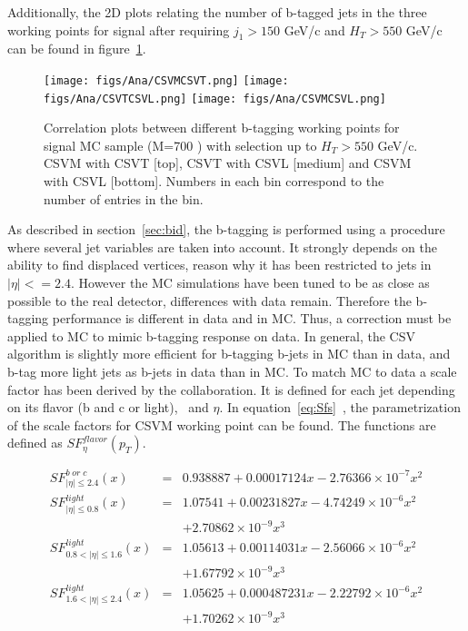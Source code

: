 Additionally, the 2D plots relating the number of b-tagged jets in the three working points for signal after requiring $j_{1}>150$ GeV/c and $H_{T}>550$ GeV/c can be found in figure~\ref{fig:WPcorr}.

\begin{figure}[!Hhtbp]
  \begin{center}
    \texttt{[image: figs/Ana/CSVMCSVT.png]}
    \texttt{[image: figs/Ana/CSVTCSVL.png]}
    \texttt{[image: figs/Ana/CSVMCSVL.png]}
    \caption{Correlation plots between different b-tagging working points for signal MC sample (M=700 \GeVcc) with selection up to $H_{T}>550$ GeV/c. CSVM with CSVT [top], CSVT with CSVL [medium] and CSVM with CSVL [bottom]. Numbers in each bin correspond to the number of entries in the bin.}
    \label{fig:WPcorr}
  \end{center}
\end{figure}

As described in section~\ref{sec:bid}, the b-tagging is performed using a procedure where several jet variables are taken into account. It strongly depends on the ability to find displaced vertices, reason why it has been restricted to jets in $|\eta|<=2.4$. However the MC simulations have been tuned to be as close as possible to the real detector, differences with data remain. Therefore the b-tagging performance is different in data and in MC. Thus, a correction must be applied to MC to mimic b-tagging response on data. In general, the CSV algorithm is slightly more efficient for b-tagging b-jets in MC than in data, and b-tag more light jets as b-jets in data than in MC. To match MC to data a scale factor has been derived by the collaboration. It is defined for each jet depending on its flavor (b and c or light), \pt~and $\eta$. In equation~\ref{eq:Sfs}~\cite{CMS-PAS-BTV-13-001}, the parametrization of the scale factors for CSVM working point can be found. The functions are defined as $SF^{flavor}_{\eta}(p_{T})$.

\begin{eqnarray}
  \label{eq:Sfs}
  SF^{b\; or\; c}_{|\eta|\le 2.4}(x) & = & 0.938887 + 0.00017124x - 2.76366 \times 10^{-7}x^{2} \nonumber \\
  SF^{light}_{|\eta|\le 0.8}(x) & = & 1.07541 + 0.00231827x - 4.74249 \times 10^{-6}x^{2}  \nonumber \\
  &  & +2.70862 \times 10^{-9}x^{3} \nonumber \\
  SF^{light}_{0.8 < |\eta|\le 1.6}(x) & = & 1.05613 + 0.00114031x - 2.56066 \times 10^{-6}x^{2} \nonumber \\
  &  & + 1.67792 \times 10^{-9}x^{3} \nonumber \\
  SF^{light}_{1.6 < |\eta|\le 2.4}(x) & = & 1.05625 + 0.000487231x - 2.22792 \times 10^{-6}x^{2} \nonumber \\
  &  & + 1.70262 \times 10^{-9}x^{3}
\end{eqnarray}

